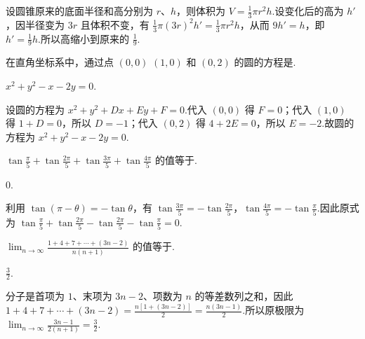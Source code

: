 \documentclass[UTF8,a4paper,oneside,11pt]{ctexbook}
\begin{document}
\begin{solution}
设圆锥原来的底面半径和高分别为 \(r\)、\(h\)，则体积为 \(V=\frac13\pi r^{2}h\).设变化后的高为 \(h'\)，因半径变为 \(3r\) 且体积不变，有 \(\frac13\pi(3r)^{2}h'=\frac13\pi r^{2}h\)，从而 \(9h'=h\)，即 \(h'=\frac19h\).所以高缩小到原来的 \(\displaystyle\frac19\).
\end{solution}

\begin{problem}

在直角坐标系中，通过点 \((0,0) \) \((1,0) \) 和 \((0,2) \) 的圆的方程是\fillinblank{}.
\end{problem}

\begin{answer}
\(x^{2}+y^{2}-x-2y=0\).
\end{answer}

\begin{solution}
设圆的方程为 \(x^{2}+y^{2}+Dx+Ey+F=0\).代入 \((0,0)\) 得 \(F=0\)；代入 \((1,0)\) 得 \(1+D=0\)，所以 \(D=-1\)；代入 \((0,2)\) 得 \(4+2E=0\)，所以 \(E=-2\).故圆的方程为 \(x^{2}+y^{2}-x-2y=0\).
\end{solution}

\begin{problem}

\(\tan\frac{\pi}{5}+\tan\frac{2\pi}{5}+\tan\frac{3\pi}{5}+\tan\frac{4\pi}{5} \) 的值等于\fillinblank{}.
\end{problem}

\begin{answer}
\(0\).
\end{answer}

\begin{solution}
利用 \(\tan(\pi-\theta)=-\tan\theta\)，有 \(\tan\frac{3\pi}{5}=-\tan\frac{2\pi}{5}\)，\(\tan\frac{4\pi}{5}=-\tan\frac\pi5\).因此原式为 \(\tan\frac\pi5+\tan\frac{2\pi}5-\tan\frac{2\pi}5-\tan\frac\pi5=0\).
\end{solution}

\begin{problem}

\(\displaystyle\lim_{n\to\infty}\frac{1+4+7+\cdots+(3n-2)}{n(n+1)} \) 的值等于\fillinblank{}.
\end{problem}

\begin{answer}
\(\displaystyle \frac{3}{2}\).
\end{answer}

\begin{solution}
分子是首项为 \(1\)、末项为 \(3n-2\)、项数为 \(n\) 的等差数列之和，因此 \(1+4+7+\cdots+(3n-2)=\frac{n[1+(3n-2)]}{2}=\frac{n(3n-1)}2\).所以原极限为 \(\displaystyle\lim_{n\to\infty}\frac{3n-1}{2(n+1)}=\frac32\).
\end{solution}
\end{document}
